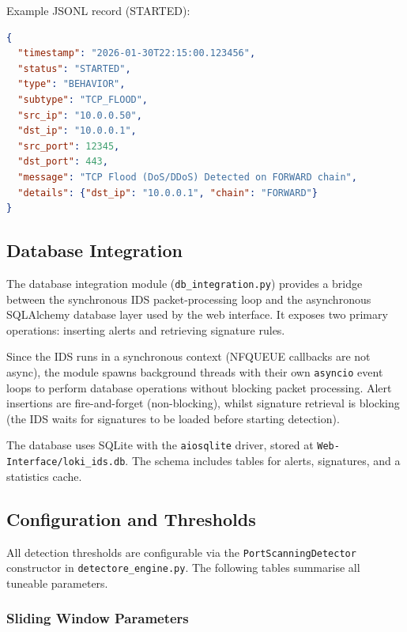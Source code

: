 \documentclass[12pt,a4paper]{article}
\begin{document}
Example JSONL record (STARTED):

\begin{lstlisting}[language=json]
{
  "timestamp": "2026-01-30T22:15:00.123456",
  "status": "STARTED",
  "type": "BEHAVIOR",
  "subtype": "TCP_FLOOD",
  "src_ip": "10.0.0.50",
  "dst_ip": "10.0.0.1",
  "src_port": 12345,
  "dst_port": 443,
  "message": "TCP Flood (DoS/DDoS) Detected on FORWARD chain",
  "details": {"dst_ip": "10.0.0.1", "chain": "FORWARD"}
}
\end{lstlisting}

\subsection{Database Integration}
\label{sec:db_integration}

The database integration module (\texttt{db\_integration.py}) provides a bridge between the synchronous IDS packet-processing loop and the asynchronous SQLAlchemy database layer used by the web interface. It exposes two primary operations: inserting alerts and retrieving signature rules.

Since the IDS runs in a synchronous context (NFQUEUE callbacks are not async), the module spawns background threads with their own \texttt{asyncio} event loops to perform database operations without blocking packet processing. Alert insertions are fire-and-forget (non-blocking), whilst signature retrieval is blocking (the IDS waits for signatures to be loaded before starting detection).

The database uses SQLite with the \texttt{aiosqlite} driver, stored at \texttt{Web-Interface/loki\_ids.db}. The schema includes tables for alerts, signatures, and a statistics cache.

\subsection{Configuration and Thresholds}
\label{sec:config}

All detection thresholds are configurable via the \texttt{PortScanningDetector} constructor in \texttt{detectore\_engine.py}. The following tables summarise all tuneable parameters.

\subsubsection{Sliding Window Parameters}
\end{document}
